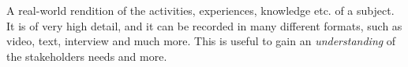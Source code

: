 \begin{tool} \label{tool:user_story} 
  A real-world rendition of the activities, experiences, knowledge etc. of a subject. It is of very high detail, and it can be recorded in many different formats, such as video, text, interview and much more. This is useful to gain an \emph{understanding} of the stakeholders needs and more. \cite[p. 62-63]{benyon_14}
\end{tool}
